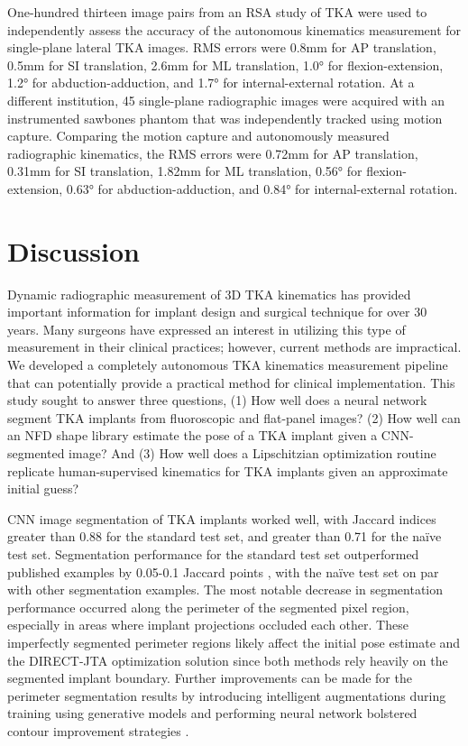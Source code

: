 One-hundred thirteen image pairs from an RSA study of TKA were used to independently assess the accuracy of the autonomous kinematics measurement for single-plane lateral TKA images. RMS errors were 0.8mm for AP translation, 0.5mm for SI translation, 2.6mm for ML translation, 1.0° for flexion-extension, 1.2° for abduction-adduction, and 1.7° for internal-external rotation. At a different institution, 45 single-plane radiographic images were acquired with an instrumented sawbones phantom that was independently tracked using motion capture. Comparing the motion capture and autonomously measured radiographic kinematics, the RMS errors were 0.72mm for AP translation, 0.31mm for SI translation, 1.82mm for ML translation, 0.56° for flexion-extension, 0.63° for abduction-adduction, and 0.84° for internal-external rotation.

\section{Discussion}
Dynamic radiographic measurement of 3D TKA kinematics has provided important information for implant design and surgical technique for over 30 years. Many surgeons have expressed an interest in utilizing this type of measurement in their clinical practices; however, current methods are impractical. We developed a completely autonomous TKA kinematics measurement pipeline that can potentially provide a practical method for clinical implementation. This study sought to answer three questions, (1) How well does a neural network segment TKA implants from fluoroscopic and flat-panel images? (2) How well can an NFD shape library estimate the pose of a TKA implant given a CNN-segmented image? And (3) How well does a Lipschitzian optimization routine replicate human-supervised kinematics for TKA implants given an approximate initial guess? 

CNN image segmentation of TKA implants worked well, with Jaccard indices greater than 0.88 for the standard test set, and greater than 0.71 for the naïve test set. Segmentation performance for the standard test set outperformed published examples by 0.05-0.1 Jaccard points \cite{zhouUNetNestedUNet2018,rodriguesDeepSegmentationLeverages2019}, with the naïve test set on par with other segmentation examples. The most notable decrease in segmentation performance occurred along the perimeter of the segmented pixel region, especially in areas where implant projections occluded each other. These imperfectly segmented perimeter regions likely affect the initial pose estimate and the DIRECT-JTA optimization solution since both methods rely heavily on the segmented implant boundary. Further improvements can be made for the perimeter segmentation results by introducing intelligent augmentations during training using generative models \cite{hatayaFasterAutoAugmentLearning2019} and performing neural network bolstered contour improvement strategies \cite{yuanSegFixModelAgnosticBoundary2020}. 

